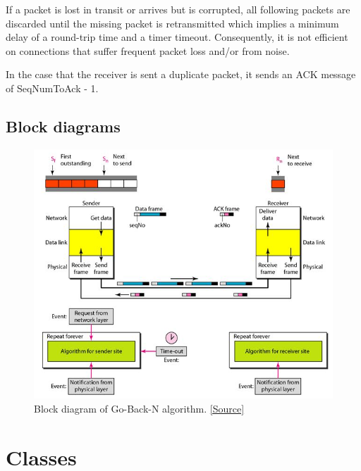\documentclass[12pt]{article}
\begin{document}
If a packet is lost in transit or arrives but is corrupted, all following packets are discarded until the missing packet is retransmitted which implies a minimum delay of a round-trip time and a timer timeout. Consequently, it is not efficient on connections that suffer frequent packet loss and/or from noise.

In the case that the receiver is sent a duplicate packet, it sends an ACK message of SeqNumToAck - 1.


\newpage
\subsection{Block diagrams}

\begin{figure}[!htb]
	\centering
	\includegraphics[width=\linewidth]{gbn.jpg}
	\caption{Block diagram of Go-Back-N algorithm. \href{http://www.myreadingroom.co.in/notes-and-studymaterial/68-dcn/813-go-back-n-arq-protocol.html}{[Source]}}\label{fig:fig1}
\end{figure}

\section{Classes}
\end{document}
